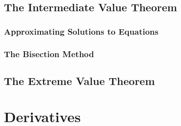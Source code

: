 \section{The Intermediate Value Theorem}
\subsection{Approximating Solutions to Equations}
\subsection{The Bisection Method}
\section{The Extreme Value Theorem}
\chapter{Derivatives}
